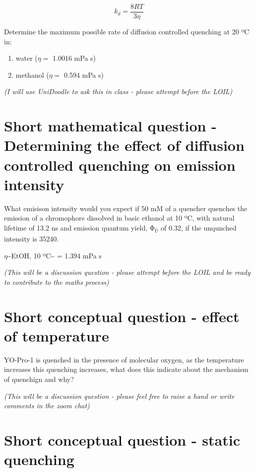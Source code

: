 \documentclass[
]{book}
\providecommand{\tightlist}{%
  \setlength{\itemsep}{0pt}\setlength{\parskip}{0pt}}
\begin{document}
\begin{equation}
k_d = \frac{8RT}{3 \eta}
\label{eq:diffcontrolrate}
\end{equation}

Determine the maximum possible rate of diffusion controlled quenching at 20 ºC in:

\begin{enumerate}
\def\labelenumi{\alph{enumi}.}
\tightlist
\item
  water (\(\eta=\) 1.0016 mPa s)
\item
  methanol (\(\eta=\) 0.594 mPa s)
\end{enumerate}

\emph{(I will use UniDoodle to ask this in class - please attempt before the LOIL)}

\hypertarget{sec:emintquench}{%
\section{Short mathematical question - Determining the effect of diffusion controlled quenching on emission intensity}\label{sec:emintquench}}

What emisison intensity would you expect if 50 mM of a quencher quenches the emission of a chromophore dissolved in basic ethanol at 10 ºC, with natural lifetime of 13.2 ns and emission quantum yield, Φ\textsubscript{f}, of 0.32, if the unqunched intensity is 35240.

\(\eta\)\textasciitilde EtOH, 10 ºC\textasciitilde{} = 1.394 mPa s

\emph{(This will be a discussion question - please attempt before the LOIL and be ready to contribute to the maths process)}

\hypertarget{sec:temp}{%
\section{Short conceptual question - effect of temperature}\label{sec:temp}}

YO-Pro-1 is quenched in the presence of molecular oxygen, as the temperature increases this quenching increases, what does this indicate about the mechanism of quenchign and why?

\emph{(This will be a discussion question - please feel free to raise a hand or write comments in the zoom chat)}

\hypertarget{sec:static}{%
\section{Short conceptual question - static quenching}\label{sec:static}}
\end{document}
